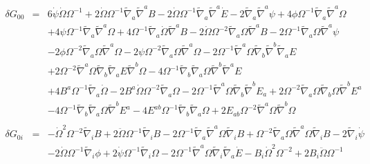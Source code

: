 \documentclass[10pt,letterpaper]{article}
\numberwithin{equation}{section}
\begin{document}
\begin{eqnarray}
\delta G_{00} &=& 
6 \dot{\psi} \dot{\Omega} \Omega^{-1}
+ 2 \dot{\Omega} \Omega^{-1} \tilde{\nabla}_{a}\tilde{\nabla}^{a}B
- 2 \dot{\Omega} \Omega^{-1} \tilde{\nabla}_{a}\tilde{\nabla}^{a}\dot{E}
- 2 \tilde{\nabla}_{a}\tilde{\nabla}^{a}\psi
+ 4 \phi \Omega^{-1} \tilde{\nabla}_{a}\tilde{\nabla}^{a}\Omega\nonumber\\
&& + 4 \psi \Omega^{-1} \tilde{\nabla}_{a}\tilde{\nabla}^{a}\Omega
+ 4 \Omega^{-1} \tilde{\nabla}_{a}\dot{\Omega} \tilde{\nabla}^{a}B
- 2 \dot{\Omega} \Omega^{-2} \tilde{\nabla}_{a}\Omega \tilde{\nabla}^{a}B
- 2 \Omega^{-1} \tilde{\nabla}_{a}\Omega \tilde{\nabla}^{a}\psi\nonumber\\
&& - 2 \phi \Omega^{-2} \tilde{\nabla}_{a}\Omega \tilde{\nabla}^{a}\Omega
- 2 \psi \Omega^{-2} \tilde{\nabla}_{a}\Omega \tilde{\nabla}^{a}\Omega
- 2 \Omega^{-1} \tilde{\nabla}^{a}\Omega \tilde{\nabla}_{b}\tilde{\nabla}^{b}\tilde{\nabla}_{a}E\nonumber\\
&& + 2 \Omega^{-2} \tilde{\nabla}^{a}\Omega \tilde{\nabla}_{b}\tilde{\nabla}_{a}E \tilde{\nabla}^{b}\Omega
- 4 \Omega^{-1} \tilde{\nabla}_{b}\tilde{\nabla}_{a}\Omega \tilde{\nabla}^{b}\tilde{\nabla}^{a}E
\nonumber\\
&&+4 B^{a} \Omega^{-1} \tilde{\nabla}_{a}\dot{\Omega}
- 2 B^{a} \dot{\Omega} \Omega^{-2} \tilde{\nabla}_{a}\Omega
- 2 \Omega^{-1} \tilde{\nabla}^{a}\Omega \tilde{\nabla}_{b}\tilde{\nabla}^{b}E_{a}
+ 2 \Omega^{-2} \tilde{\nabla}_{a}\Omega \tilde{\nabla}_{b}\Omega \tilde{\nabla}^{b}E^{a}\nonumber\\
&& - 4 \Omega^{-1} \tilde{\nabla}_{b}\tilde{\nabla}_{a}\Omega \tilde{\nabla}^{b}E^{a}
-4 E^{ab} \Omega^{-1} \tilde{\nabla}_{b}\tilde{\nabla}_{a}\Omega
+ 2 E_{ab} \Omega^{-2} \tilde{\nabla}^{a}\Omega \tilde{\nabla}^{b}\Omega
%
%
\\ \nonumber\\
%
%
\delta G_{0i} &=&
- \dot{\Omega}^2 \Omega^{-2} \tilde{\nabla}_{i}B
+ 2 \ddot{\Omega} \Omega^{-1} \tilde{\nabla}_{i}B
- 2 \Omega^{-1} \tilde{\nabla}_{a}\tilde{\nabla}^{a}\Omega \tilde{\nabla}_{i}B
+ \Omega^{-2} \tilde{\nabla}_{a}\Omega \tilde{\nabla}^{a}\Omega \tilde{\nabla}_{i}B
- 2 \tilde{\nabla}_{i}\dot{\psi}\nonumber\\
&& - 2 \dot{\Omega} \Omega^{-1} \tilde{\nabla}_{i}\phi
+ 2 \dot{\psi} \Omega^{-1} \tilde{\nabla}_{i}\Omega
- 2 \Omega^{-1} \tilde{\nabla}^{a}\Omega \tilde{\nabla}_{i}\tilde{\nabla}_{a}\dot{E}
- B_{i} \dot{\Omega}^2 \Omega^{-2}
+ 2 B_{i} \ddot{\Omega} \Omega^{-1}
\nonumber\\

\end{eqnarray}
\end{document}
